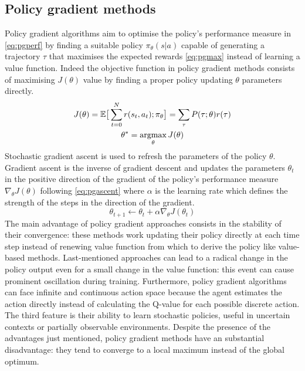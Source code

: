 \subsection{Policy gradient methods}

Policy gradient algorithms aim to optimise the policy's performance measure in \vref{eq:pgperf} by finding a suitable policy $\pi_\theta(s|a)$ capable of generating a trajectory $\tau$ that maximises the expected rewards \vref{eq:pgmax} instead of learning a  value function. Indeed the objective function in policy gradient methods consists of maximising $J(\theta)$ value by finding a proper policy updating $\theta$ parameters directly.
\begin{gather} 
J(\theta) = \mathbb{E}\big[\sum_{t=0}^{N}r(s_t,a_t); \pi_\theta\big] = \sum_{\tau}P(\tau;\theta)r(\tau) \label{eq:pgperf}\\
\theta^* = \operatornamewithlimits{argmax}_\theta J(\theta) \label{eq:pgmax}
\end{gather}
Stochastic gradient ascent is used to refresh the parameters of the policy $\theta$. Gradient ascent is the inverse of gradient descent and updates the parameters $\theta_t$ in the positive direction of the gradient of the policy’s performance measure $\nabla_\theta J(\theta)$ following \vref{eq:pgascent} where $\alpha$ is the learning rate which defines the strength of the steps in the direction of the gradient.
\begin{equation} 
\theta_{t+1} \leftarrow \theta_t + \alpha \nabla_\theta J(\theta_t) \label{eq:pgascent}
\end{equation}
The main advantage of policy gradient approaches consists in the stability of their convergence: these methods work updating their policy directly at each time step instead of renewing value function from which to derive the policy like value-based methods. Last-mentioned approaches can lead to a radical change in the policy output even for a small change in the value function: this event can cause prominent oscillation during training.
Furthermore, policy gradient algorithms can face infinite and continuous action space because the agent estimates the action directly instead of calculating the Q-value for each possible discrete action.
The third feature is their ability to learn stochastic policies, useful in uncertain contexts or partially observable environments. 
Despite the presence of the advantages just mentioned, policy gradient methods have an substantial disadvantage: they tend to converge to a local maximum instead of the global optimum.

